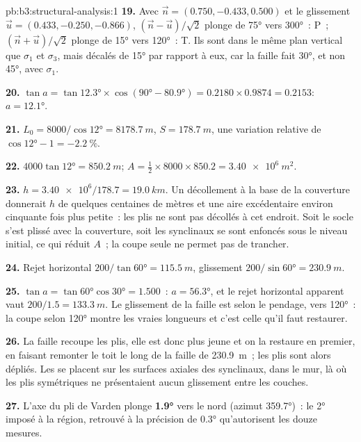 \begin{solution}{pb:b3:structural-analysis:1}
\textbf{19.} Avec $\vec n = (0.750, -0.433, 0.500)$ et le glissement $\vec u =
(0.433, -0.250, -0.866)$, $(\vec n - \vec u)/\sqrt2$ plonge de \ang{75} vers
\ang{300}~: P~; $(\vec n + \vec u)/\sqrt2$ plonge de \ang{15} vers \ang{120}~:
T. Ils sont dans le même plan vertical que $\sigma_1$ et $\sigma_3$, mais
décalés de \ang{15} par rapport à eux, car la faille fait \ang{30}, et non \ang{45}, avec
$\sigma_1$.

\textbf{20.} $\tan a = \tan\ang{12.3}\times\cos(\ang{90} - \ang{80.9}) =
0.2180\times0.9874 = 0.2153$: $a = \ang{12.1}$.

\textbf{21.} $L_0 = 8000/\cos\ang{12} = \qty{8178.7}{m}$, $S =
\qty{178.7}{m}$, une variation relative de $\cos\ang{12} - 1 =
\qty{-2.2}{\percent}$.

\textbf{22.} $4000\tan\ang{12} = \qty{850.2}{m}$; $A = \tfrac12\times8000\times
850.2 = \qty{3.40e6}{m^2}$.

\textbf{23.} $h = \num{3.40e6}/178.7 = \qty{19.0}{km}$. Un décollement à la
base de la couverture donnerait $h$ de quelques centaines de mètres et une aire
excédentaire environ cinquante fois plus petite~: les plis ne sont pas décollés à cet endroit. Soit le
socle s'est plissé avec la couverture, soit les synclinaux se sont enfoncés sous le
niveau initial, ce qui réduit $A$~; la coupe seule ne permet pas de trancher.

\textbf{24.} Rejet horizontal $200/\tan\ang{60} = \qty{115.5}{m}$, glissement $200/\sin\ang{60}
= \qty{230.9}{m}$.

\textbf{25.} $\tan a = \tan\ang{60}\cos\ang{30} = 1.500$~: $a = \ang{56.3}$, et
le rejet horizontal apparent vaut $200/1.5 = \qty{133.3}{m}$. Le glissement de la faille est
selon le pendage, vers \ang{120}~: la coupe selon \ang{120} montre les vraies
longueurs et c'est celle qu'il faut restaurer.

\textbf{26.} La faille recoupe les plis, elle est donc plus jeune et on la restaure en premier,
en faisant remonter le toit le long de la faille de \qty{230.9}{m}~; les plis sont
alors dépliés. Les  se placent sur les surfaces axiales des synclinaux, dans le
mur, là où les plis symétriques ne présentaient aucun glissement entre les couches.

\textbf{27.} L'axe du pli de Varden plonge
\textbf{\ang[text-series-to-math=true]{1.9}} vers le nord (azimut
\ang{359.7})~: le \ang{2} imposé à la région, retrouvé à la
précision de \ang{0.3} qu'autorisent les douze mesures.
\end{solution}
